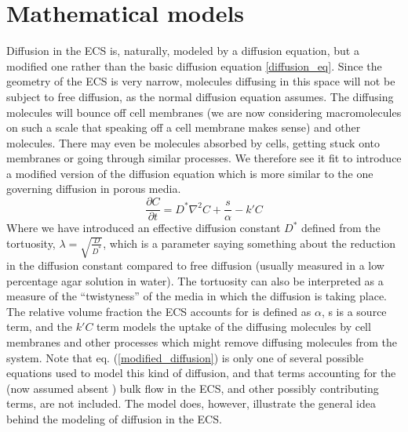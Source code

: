 \documentclass[a4paper,english, 12pt, twoside]{article}
\renewcommand{\d}{\partial}
\begin{document}
\section{Mathematical models}
Diffusion in the ECS is, naturally, modeled by a diffusion equation, but a modified one rather than the basic diffusion equation \ref{diffusion_eq}. 
Since the geometry of the ECS is very narrow, molecules diffusing in this space will not be subject to free diffusion, as the normal diffusion equation assumes. 
The diffusing molecules will bounce off cell membranes (we are now considering macromolecules on such a scale that speaking off a cell membrane makes sense) and other molecules. 
There may even be molecules absorbed by cells, getting stuck onto membranes or going through similar processes. 
We therefore see it fit to introduce a modified version of the diffusion equation which is more similar to the one governing diffusion in porous media. 
\begin{equation}\label{modified_diffusion}
  \frac{\d C}{\d t} = D^*\nabla^2C +\frac{s}{\alpha} -k'C
\end{equation}
Where we have introduced an effective diffusion constant $D^*$ defined from the tortuosity, $\lambda = \sqrt{\frac{D}{D^*}}$, which is a parameter saying something about the reduction in the diffusion 
constant compared to free diffusion (usually measured in a low percentage agar solution in water). 
The tortuosity can also be interpreted as a measure of the ``twistyness'' of the media in which the diffusion is taking place. 
The relative volume fraction the ECS accounts for is defined as $\alpha$, s is a source term, and the $k'C$ term models the uptake of the diffusing molecules by cell membranes and other processes which might remove diffusing molecules from the system. 
Note that eq. (\ref{modified_diffusion}) is only one of several possible equations used to model this kind of diffusion, and that terms accounting for the (now assumed absent \cite{nicholson2001diffusion}) bulk flow in the ECS, and other possibly contributing terms, are not included. 
The model does, however, illustrate the general idea behind the modeling of diffusion in the ECS.
\end{document}
